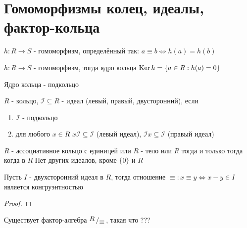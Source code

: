 \documentclass[../main/document.tex]{subfiles}
\begin{document}
\section{Гомоморфизмы колец, идеалы, фактор-кольца}
\begin{dfn}
$h:R\to S$ - гомоморфизм, определённый так: $a\equiv b\Leftrightarrow h(a)=h(b)$
\end{dfn}
\begin{dfn}
$h:R\to S$ - гомоморфизм, тогда ядро кольца $\operatorname{Ker} h=\{a\in R:h(a)=0\}$ 
\end{dfn}
\begin{thm}
Ядро кольца - подкольцо
\end{thm}
\begin{dfn}[Идеал]
$R$ - кольцо, $\mathcal{I}\subseteq R$ - идеал (левый, правый, двусторонний), если
\begin{enumerate}
\item $\mathcal{I}$ - подкольцо
\item для любого $x\in R$ $x\mathcal{I}\subseteq\mathcal{I}$ (левый идеал), $\mathcal{I} x\subseteq\mathcal{I}$ (правый идеал)
\end{enumerate}
\end{dfn}
\begin{exm}

\end{exm}
\begin{thm}
$R$ - ассоциативное кольцо с единицей или $R$ - тело или $R$ тогда и только тогда когда в $R$ Нет других идеалов, кроме $\{0\}$ и $R$
\end{thm}
\begin{dfn}

\end{dfn}
\begin{thm}
Пусть $I$ - двухсторонний идеал в $R$, тогда отношение $\equiv: x\equiv y \Leftrightarrow x-y\in I$ является конгруэнтностью
\begin{proof}

\end{proof}
\end{thm}
\begin{cnsq}
Существует фактор-алгебра $\bigslant{R}{\equiv}$, такая что ???
\end{cnsq}
\end{document}
